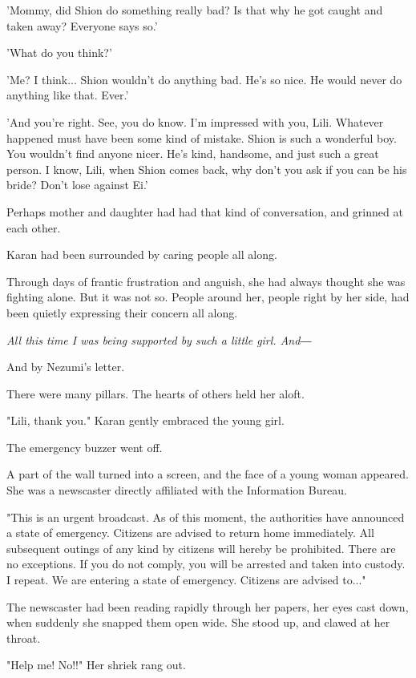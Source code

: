 'Mommy, did Shion do something really bad? Is that why he got caught and
taken away? Everyone says so.'

'What do you think?'

'Me? I think... Shion wouldn't do anything bad. He's so nice. He would
never do anything like that. Ever.'

'And you're right. See, you do know. I'm impressed with you, Lili.
Whatever happened must have been some kind of mistake. Shion is such a
wonderful boy. You wouldn't find anyone nicer. He's kind, handsome, and
just such a great person. I know, Lili, when Shion comes back, why don't
you ask if you can be his bride? Don't lose against Ei.'

Perhaps mother and daughter had had that kind of conversation, and
grinned at each other.

Karan had been surrounded by caring people all along.

Through days of frantic frustration and anguish, she had always thought
she was fighting alone. But it was not so. People around her, people
right by her side, had been quietly expressing their concern all along.

\emph{All this time I was being supported by such a little girl. And―}


And by Nezumi's letter.

There were many pillars. The hearts of others held her aloft.

"Lili, thank you." Karan gently embraced the young girl.

The emergency buzzer went off.

A part of the wall turned into a screen, and the face of a young woman
appeared. She was a newscaster directly affiliated with the Information
Bureau.

"This is an urgent broadcast. As of this moment, the authorities have
announced a state of emergency. Citizens are advised to return home
immediately. All subsequent outings of any kind by citizens will hereby
be prohibited. There are no exceptions. If you do not comply, you will
be arrested and taken into custody. I repeat. We are entering a state of
emergency. Citizens are advised to..."

The newscaster had been reading rapidly through her papers, her eyes
cast down, when suddenly she snapped them open wide. She stood up, and
clawed at her throat.

"Help me! No!!" Her shriek rang out.

